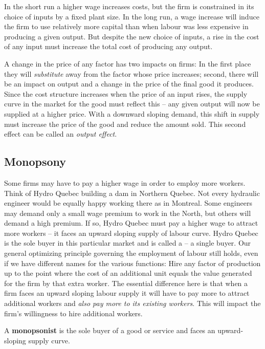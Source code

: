 In the short run a higher wage increases costs, but the firm is constrained
in its choice of inputs by a fixed plant size. In the long run, a wage
increase will induce the firm to use relatively more capital than when
labour was less expensive in producing a given output. But despite the new
choice of inputs, a rise in the cost of any input must increase the total
cost of producing any output.

A change in the price of any factor has two impacts on firms: In the first
place they will \textit{substitute} away from the factor whose price
increases; second, there will be an impact on output and a change in the
price of the final good it produces. Since the cost structure increases when
the price of an input rises, the supply curve in the market for the good
must reflect this -- any given output will now be supplied at a higher
price. With a downward sloping demand, this shift in supply must increase
the price of the good and reduce the amount sold. This second effect can be
called an \textit{output effect}.

\newhtmlpage

\subsection*{Monopsony}

Some firms may have to pay a higher wage in order to employ more workers.
Think of Hydro Quebec building a dam in Northern Quebec. Not every hydraulic
engineer would be equally happy working there as in Montreal. Some engineers
may demand only a small wage premium to work in the North, but others will
demand a high premium. If so, Hydro Quebec must pay a higher wage to attract
more workers -- it faces an upward sloping supply of labour curve. Hydro
Quebec is the sole buyer in this particular market and is called a %
 -- a single buyer. Our general optimizing
principle governing the employment of labour still holds, even if we have
different names for the various functions: Hire any factor of production up
to the point where the cost of an additional unit equals the value generated
for the firm by that extra worker. The essential difference here is that
when a firm faces an upward sloping labour supply it will have to pay more
to attract additional workers and \textit{also pay more to its existing
workers}. This will impact the firm's willingness to hire additional workers.

\begin{DefBox}
A \textbf{monopsonist} is the sole buyer of a good or service and faces an upward-sloping supply curve.
\end{DefBox}

